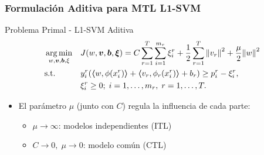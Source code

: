\documentclass{beamer}
\DeclareMathOperator*{\argmin}{arg\min}
\newcommand{\norm}[1]{\left\lVert#1\right\rVert}
\newcommand{\myvec}[1]{\bm{#1}}
\newcommand{\fv}[1]{\myvec{#1}}
\newcommand{\dotp}[2]{\bm{\left\langle} #1, #2 \bm{\right\rangle}}
\begin{document}
\begin{frame}
      \frametitle{Formulación Aditiva para MTL L1-SVM}
  
      \begin{block}{Problema Primal - L1-SVM Aditiva}
          \begin{equation}\nonumber
              \begin{aligned}
              & \argmin_{w, \fv{v}, \fv{b}, \xi}
              & & {J({w}, \fv{v}, \fv{b}, \fv{\xi}) = C \sum_{r= 1}^T \sum_{i=1}^{m_r} {\xi_{i}^r} + \frac{1}{2} \sum_{r= 1}^T{\norm{{v}_r}^2} + \frac{\mu}{2} {\norm{{w}}}^2} \\
              & \text{s.t.}
              & & y_{i}^r (\dotp{w}{\phi(x_{i}^r)} + \dotp{v_r}{\phi_r(x_{i}^r)} + b_r) \geq p_{i}^r - \xi_{i}^r ,  \\
              & & & \xi_{i}^r \geq 0; \;  i=1 , \dotsc , m_r, \;  r= 1,\dotsc, T  . \\
              \end{aligned}
          \end{equation}   
      \end{block}
      \begin{itemize}
          \item El parámetro $\mu$ (junto con $C$) regula la influencia de cada parte:
          \begin{itemize}
              \item $\mu \to \infty$: modelos independientes (ITL)
              \item $C \to 0,\; \mu \to 0$: modelo común (CTL)
          \end{itemize}
      \end{itemize}
  \end{frame}
  
\end{document}
